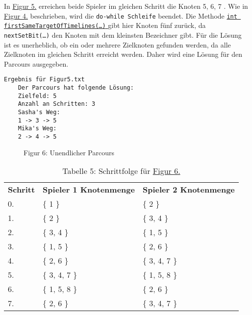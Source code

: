 \documentclass[a4paper,10pt,ngerman]{scrartcl}
\begin{document}
	In \hyperref[fig:Figure5]{Figur 5.} erreichen beide Spieler im gleichen Schritt die Knoten { 5, 6, 7 }.
	Wie in \hyperref[fig:Figure4]{Figur 4.} beschrieben, wird die \texttt{do-while Schleife} beendet.
	Die Methode \hyperref[lst:firstSameTargetOfTimelines]{\texttt{int firstSameTargetOfTimelines(\ldots)} } 
	gibt hier Knoten fünf zurück, da \texttt{nextSetBit(\ldots)} den Knoten mit dem kleinsten Bezeichner gibt.
	Für die Lösung ist es unerheblich, ob ein oder mehrere Zielknoten gefunden werden, 
	da alle Zielknoten im gleichen Schritt erreicht werden. 
	Daher wird eine Lösung für den Parcours ausgegeben.
	
		\begin{lstlisting}[frame=single, title=Programmausgabe Figur 5., breaklines=true]
  Ergebnis für Figur5.txt
	Der Parcours hat folgende Lösung:
	Zielfeld: 5
	Anzahl an Schritten: 3
	Sasha's Weg: 
	1 -> 3 -> 5
	Mika's Weg: 
	2 -> 4 -> 5
    \end{lstlisting}

    \begin{figure}[h!]
        \centering
        \FigurSechs{}
        \caption{Figur 6: Unendlicher Parcours}
        \label{fig:Figure6}
    \end{figure}

    \begin{table}[h!]
        \centering
        \begin{tabular}{lll}
            \textbf{Schritt} & \textbf{Spieler 1 Knotenmenge} & \textbf{Spieler 2 Knotenmenge} \\
            0.               & \{ 1 \}                        & \{ 2 \}                        \\
            1.               & \{ 2 \}                        & \{ 3, 4 \}                     \\
            2.               & \{ 3, 4 \}                     & \{ 1, 5 \}                     \\
            3.               & \{ 1, 5 \}                     & \{ 2, 6 \}                     \\
            4.               & \{ 2, 6 \}                     & \{ 3, 4, 7 \}                  \\
            5.               & \{ 3, 4, 7 \}                  & \{ 1, 5, 8 \}                  \\
            6.               & \{ 1, 5, 8 \}                  & \{ 2, 6 \}                     \\
            7.               & \{ 2, 6 \}                     & \{ 3, 4, 7 \}                  \\
        \end{tabular}
        \caption{Tabelle 5: Schrittfolge für \hyperref[fig:Figure6]{Figur 6.}}
        \label{tab:Table5}
    \end{table}
    
\end{document}
